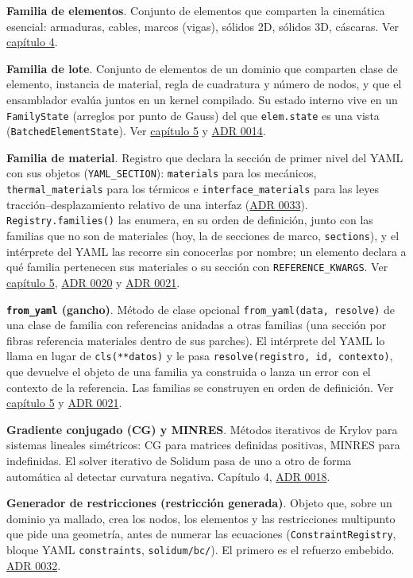 \documentclass[11pt,oneside]{report}
\begin{document}
\textbf{Familia de elementos}. Conjunto de elementos que comparten la cinemática esencial: armaduras, cables, marcos (vigas), sólidos 2D, sólidos 3D, cáscaras. Ver \hyperref[cap:4]{capítulo 4}.

\textbf{Familia de lote}. Conjunto de elementos de un dominio que comparten clase de elemento, instancia de material, regla de cuadratura y número de nodos, y que el ensamblador evalúa juntos en un kernel compilado. Su estado interno vive en un \texttt{FamilyState} (arreglos por punto de Gauss) del que \texttt{elem.state} es una vista (\texttt{BatchedElementState}). Ver \hyperref[cap:5]{capítulo 5} y \hyperref[adr:0014]{ADR 0014}.

\textbf{Familia de material}. Registro que declara la sección de primer nivel del YAML con sus objetos (\texttt{YAML\_SECTION}): \texttt{materials} para los mecánicos, \texttt{thermal\_\allowbreak{}materials} para los térmicos e \texttt{interface\_\allowbreak{}materials} para las leyes tracción--desplazamiento relativo de una interfaz (\hyperref[adr:0033]{ADR 0033}). \texttt{Registry.\allowbreak{}families()} las enumera, en su orden de definición, junto con las familias que no son de materiales (hoy, la de secciones de marco, \texttt{sections}), y el intérprete del YAML las recorre sin conocerlas por nombre; un elemento declara a qué familia pertenecen sus materiales o su sección con \texttt{REFERENCE\_KWARGS}. Ver \hyperref[cap:5]{capítulo 5}, \hyperref[adr:0020]{ADR 0020} y \hyperref[adr:0021]{ADR 0021}.

\textbf{\texttt{from\_yaml} (gancho)}. Método de clase opcional \texttt{from\_\allowbreak{}yaml(data, resolve)} de una clase de familia con referencias anidadas a otras familias (una sección por fibras referencia materiales dentro de sus parches). El intérprete del YAML lo llama en lugar de \texttt{cls(**datos)} y le pasa \texttt{resolve(registro, id, contexto)}, que devuelve el objeto de una familia ya construida o lanza un error con el contexto de la referencia. Las familias se construyen en orden de definición. Ver \hyperref[cap:5]{capítulo 5} y \hyperref[adr:0021]{ADR 0021}.

\textbf{Gradiente conjugado (CG) y MINRES}. Métodos iterativos de Krylov para sistemas lineales simétricos: CG para matrices definidas positivas, MINRES para indefinidas. El solver iterativo de Solidum pasa de uno a otro de forma automática al detectar curvatura negativa. Capítulo 4, \hyperref[adr:0018]{ADR 0018}.

\textbf{Generador de restricciones (restricción generada)}. Objeto que, sobre un dominio ya mallado, crea los nodos, los elementos y las restricciones multipunto que pide una geometría, antes de numerar las ecuaciones (\texttt{ConstraintRegistry}, bloque YAML \texttt{constraints}, \texttt{solidum/bc/}). El primero es el refuerzo embebido. \hyperref[adr:0032]{ADR 0032}.
\end{document}
